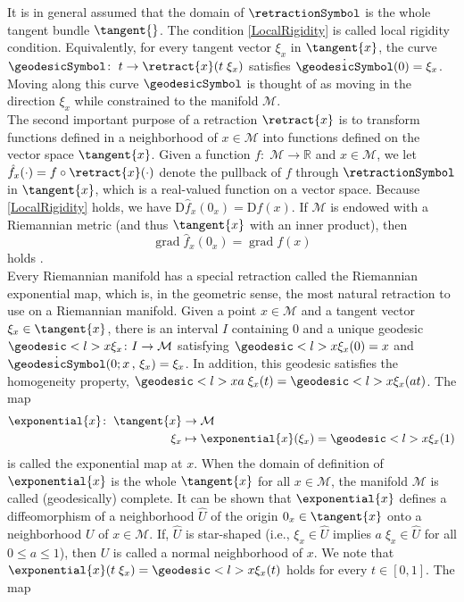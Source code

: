 It is in general assumed that the domain of $\retractionSymbol$ is the whole tangent bundle $\tangent{}$. The condition \cref{LocalRigidity} is called local rigidity condition. Equivalently, for every tangent vector $\xi_x$ in $\tangent{x}$, the curve $\geodesicSymbol \colon \; t \to \retract{x}(t \; \xi_x)$ satisfies $\dot{\geodesicSymbol}(0) = \xi_x$. Moving along this curve $\geodesicSymbol$ is thought of as moving in the direction $\xi_x$ while constrained to the manifold $\mathcal{M}$. \\
The second important purpose of a retraction $\retract{x}$ is to transform functions defined in a neighborhood of $x \in \mathcal{M}$ into functions defined on the vector space $\tangent{x}$. Given a function $f \colon \; \mathcal{M} \to \mathbb{R}$ and $x \in \mathcal{M}$, we let $\hat{f}_x (\cdot) = f \circ \retract{x}(\cdot)$ denote the pullback of $f$ through $\retractionSymbol$ in $\tangent{x}$, which is a real-valued function on a vector space. Because \cref{LocalRigidity} holds, we have $\mathrm{D} \hat{f}_x (0_x) = \mathrm{D} f(x)$. If $\mathcal{M}$ is endowed with a Riemannian metric (and thus $\tangent{x}$ with an inner product), then
\begin{equation*}
    \operatorname{grad} \hat{f}_x (0_x) = \operatorname{grad} f(x)
\end{equation*}
holds \cite[p.~55-56]{AbsilMahonySepulchre:2008}. \\ 
Every Riemannian manifold has a special retraction called the Riemannian exponential map, which is, in the geometric sense, the most natural retraction to use on a Riemannian manifold. Given a point $x \in \mathcal{M}$ and a tangent vector $\xi_x \in \tangent{x}$, there is an interval $I$ containing $0$ and a unique geodesic $\geodesic<l>{x}{\xi_x} \colon I \to \mathcal{M}$ satisfying $\geodesic<l>{x}{\xi_x}(0) = x$ and $\dot{\geodesicSymbol}(0; x \, , \, \xi_x) = \xi_x$. In addition, this geodesic satisfies the homogeneity property, $\geodesic<l>{x}{a \; \xi_x}(t) = \geodesic<l>{x}{\xi_x}(at)$. The map 
\begin{align}\label{ExponentialMap}
    \exponential{x} \colon \; \tangent{x} & \to \mathcal{M} \\
    \xi_x & \mapsto \exponential{x}(\xi_x) = \geodesic<l>{x}{\xi_x}(1)
\end{align}
is called the exponential map at $x$. When the domain of definition of $\exponential{x}$ is the whole $\tangent{x}$ for all $x \in \mathcal{M}$, the manifold $\mathcal{M}$ is called (geodesically) complete. It can be shown that $\exponential{x}$ defines a diffeomorphism of a neighborhood $\hat{U}$ of the origin $0_x \in \tangent{x}$ onto a neighborhood $U$ of $x \in \mathcal{M}$. If, $\hat{U}$ is star-shaped (i.e., $\xi_x \in \hat{U}$ implies $a \; \xi_x \in \hat{U}$ for all $0 \leq a \leq 1$), then $U$ is called a normal neighborhood of $x$. We note that $\exponential{x}(t \; \xi_x) = \geodesic<l>{x}{\xi_x}(t)$ holds for every $t \in [0,1]$. The map
